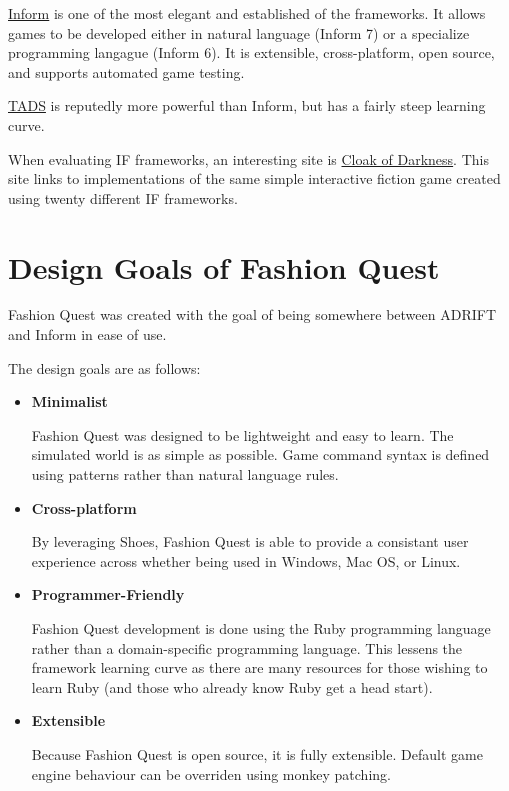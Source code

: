 \documentclass[letterpaper,10pt,english]{manual}
\begin{document}
\href{http://www.inform-fiction.org/I7/Welcome.html}{Inform} is one of the most elegant and established of the frameworks. It allows games to be developed either in natural language (Inform 7) or a specialize programming langague (Inform 6). It is extensible, cross-platform, open source, and supports automated game testing.

\href{http://www.tads.org/}{TADS} is reputedly more powerful than Inform, but has a fairly steep learning curve.

When evaluating IF frameworks, an interesting site is \href{http://www.firthworks.com/roger/cloak/index.html}{Cloak of Darkness}. This site links to implementations of the same simple interactive fiction game created using twenty different IF frameworks.


\section{Design Goals of Fashion Quest}

Fashion Quest was created with the goal of being somewhere between ADRIFT and Inform in ease of use.

The design goals are as follows:
\begin{itemize}
\item {} 
\textbf{Minimalist}

Fashion Quest was designed to be lightweight and easy to learn. The simulated world is as simple as possible. Game command syntax is defined using patterns rather than natural language rules.

\item {} 
\textbf{Cross-platform}

By leveraging Shoes, Fashion Quest is able to provide a consistant user experience across whether being used in Windows, Mac OS, or Linux.

\item {} 
\textbf{Programmer-Friendly}

Fashion Quest development is done using the Ruby programming language rather than a domain-specific programming language. This lessens the framework learning curve as there are many resources for those wishing to learn Ruby (and those who already know Ruby get a head start).

\item {} 
\textbf{Extensible}

Because Fashion Quest is open source, it is fully extensible. Default game engine behaviour can be overriden using monkey patching.

\end{itemize}
\end{document}
